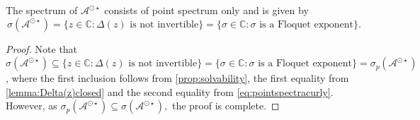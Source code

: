 \documentclass[english]{myarticle}
\begin{document}
\begin{sloppypar}
\begin{corollary} \label{cor:equivalencefloquet}
The spectrum of $\mathcal{A}^{\odot \star}$ consists of point spectrum only and is given by
\begin{equation} \label{eq:spectraequivalent}    
\sigma(\mathcal{A}^{\odot \star}) = \{ z \in \mathbb{C} : \Delta(z) \mbox{ is not invertible} \} =\{ \sigma \in \mathbb{C} : \sigma \mbox{ is a Floquet exponent} \}.
\end{equation}
\end{corollary}
\begin{proof}
Note that $\sigma(\mathcal{A}^{\odot \star}) \subseteq \{ z \in \mathbb{C} : \Delta(z) \mbox{ is not invertible} \} = \{\sigma \in \mathbb{C} : \sigma \mbox{ is a Floquet exponent} \} = \sigma_p(\mathcal{A}^{\odot \star})$, where the first inclusion follows from \cref{prop:solvability}, the first equality from \cref{lemma:Delta(z)closed} and the second equality from \eqref{eq:pointspectracurly}. However, as $\sigma_p(\mathcal{A}^{\odot \star}) \subseteq \sigma(\mathcal{A}^{\odot \star}),$ the proof is complete. 
\end{proof}


\end{sloppypar}
\end{document}
